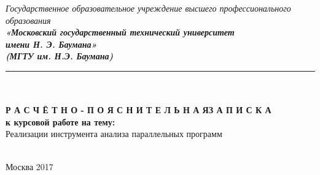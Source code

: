 


\begin{center}
	\hfill \break
	\textit{
		\normalsize{Государственное образовательное учреждение высшего профессионального образования}}\\ 
	
	\textit{
		\normalsize  {\bf  «Московский государственный технический университет}\\ 
		\normalsize  {\bf имени Н. Э. Баумана»}\\
		\normalsize  {\bf (МГТУ им. Н.Э. Баумана)}\\
	}
	\noindent\rule{\textwidth}{2pt}
	\hfill \break
	\noindent
	\\
	\noindent
	\\
	\hfill\break
	\hfill \break
	\hfill \break
	\hfill \break
	\normalsize{\bf Р А С Ч Ё Т Н О - П О Я С Н И Т Е Л Ь Н А Я\space\space З А П И С К А}\\
	\normalsize{\bf к курсовой работе на тему:}\\
	\hfill \break
	\large{Реализации инструмента анализа параллельных программ}\\
	\hfill \break
	\hfill \break
	\hfill \break
	\hfill \break
	\hfill \break	
	\normalsize {
		\noindent
	}\\
	\hfill \break	
	\normalsize {
		\noindent
	}
	\hfill \break
	\hfill \break
	\hfill \break
	\hfill \break
\end{center}
\hfill \break
\hfill \break
\begin{center} Москва 2017 \end{center}

\thispagestyle{empty} %


